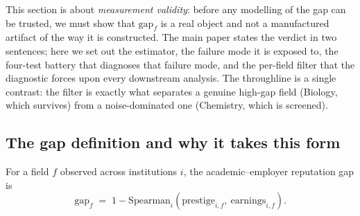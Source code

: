 \documentclass[11pt]{article}
\begin{document}
This section is about \emph{measurement validity}: before any modelling of the gap can be trusted, we must show that $\mathrm{gap}_f$ is a real object and not a manufactured artifact of the way it is constructed. The main paper states the verdict in two sentences; here we set out the estimator, the failure mode it is exposed to, the four-test battery that diagnoses that failure mode, and the per-field filter that the diagnostic forces upon every downstream analysis. The throughline is a single contrast: the filter is exactly what separates a genuine high-gap field (Biology, which survives) from a noise-dominated one (Chemistry, which is screened).

\subsection{The gap definition and why it takes this form}

For a field $f$ observed across institutions $i$, the academic--employer reputation gap is
\[
\mathrm{gap}_f \;=\; 1 - \mathrm{Spearman}_i\!\left(\mathrm{prestige}_{i,f},\ \mathrm{earnings}_{i,f}\right).
\]
\end{document}

